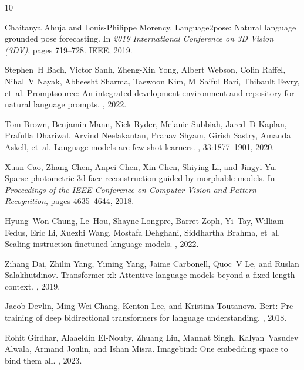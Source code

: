 \documentclass{article}
\begin{document}
\newpage
{
\small

\begin{thebibliography}{10}

  Chaitanya Ahuja and Louis-Philippe Morency.
  \newblock Language2pose: Natural language grounded pose forecasting.
  \newblock In {\em 2019 International Conference on 3D Vision (3DV)}, pages
    719--728. IEEE, 2019.
  
  Stephen~H Bach, Victor Sanh, Zheng-Xin Yong, Albert Webson, Colin Raffel,
    Nihal~V Nayak, Abheesht Sharma, Taewoon Kim, M~Saiful Bari, Thibault Fevry,
    et~al.
  \newblock Promptsource: An integrated development environment and repository
    for natural language prompts.
  , 2022.
  
  Tom Brown, Benjamin Mann, Nick Ryder, Melanie Subbiah, Jared~D Kaplan, Prafulla
    Dhariwal, Arvind Neelakantan, Pranav Shyam, Girish Sastry, Amanda Askell,
    et~al.
  \newblock Language models are few-shot learners.
  ,
    33:1877--1901, 2020.
  
  Xuan Cao, Zhang Chen, Anpei Chen, Xin Chen, Shiying Li, and Jingyi Yu.
  \newblock Sparse photometric 3d face reconstruction guided by morphable models.
  \newblock In {\em Proceedings of the IEEE Conference on Computer Vision and
    Pattern Recognition}, pages 4635--4644, 2018.
  
  Hyung~Won Chung, Le~Hou, Shayne Longpre, Barret Zoph, Yi~Tay, William Fedus,
    Eric Li, Xuezhi Wang, Mostafa Dehghani, Siddhartha Brahma, et~al.
  \newblock Scaling instruction-finetuned language models.
  , 2022.
  
  Zihang Dai, Zhilin Yang, Yiming Yang, Jaime Carbonell, Quoc~V Le, and Ruslan
    Salakhutdinov.
  \newblock Transformer-xl: Attentive language models beyond a fixed-length
    context.
  , 2019.
  
  Jacob Devlin, Ming-Wei Chang, Kenton Lee, and Kristina Toutanova.
  \newblock Bert: Pre-training of deep bidirectional transformers for language
    understanding.
  , 2018.
  
  Rohit Girdhar, Alaaeldin El-Nouby, Zhuang Liu, Mannat Singh, Kalyan~Vasudev
    Alwala, Armand Joulin, and Ishan Misra.
  \newblock Imagebind: One embedding space to bind them all.
  , 2023.
  

\end{thebibliography}}
\end{document}
